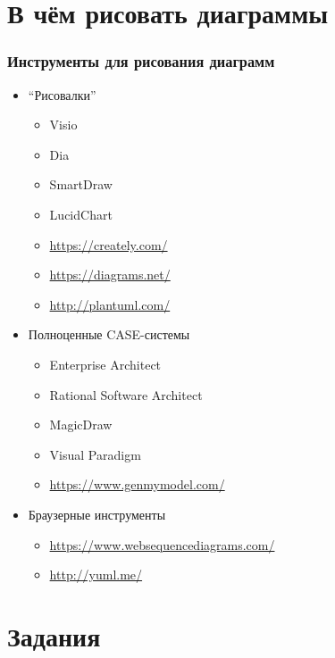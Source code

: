 \documentclass{../mcsslides}
\begin{document}
    
    \begin{frame}[plain]
        \titlepage
    \end{frame}

    \section{В чём рисовать диаграммы}

    \begin{frame}
        \frametitle{Инструменты для рисования диаграмм}
        \begin{itemize}
            \item ``Рисовалки''
            \begin{itemize}
                \item Visio
                \item Dia
                \item SmartDraw
                \item LucidChart
                \item \url{https://creately.com/}
                \item \url{https://diagrams.net/}
                \item \url{http://plantuml.com/}
            \end{itemize}
            \item Полноценные CASE-системы
            \begin{itemize}
                \item Enterprise Architect
                \item Rational Software Architect
                \item MagicDraw
                \item Visual Paradigm
                \item \url{https://www.genmymodel.com/}
            \end{itemize}
            \item Браузерные инструменты
            \begin{itemize}
                \item \url{https://www.websequencediagrams.com/}
                \item \url{http://yuml.me/}
            \end{itemize}
        \end{itemize}
    \end{frame}

    \section{Задания}
\end{document}
